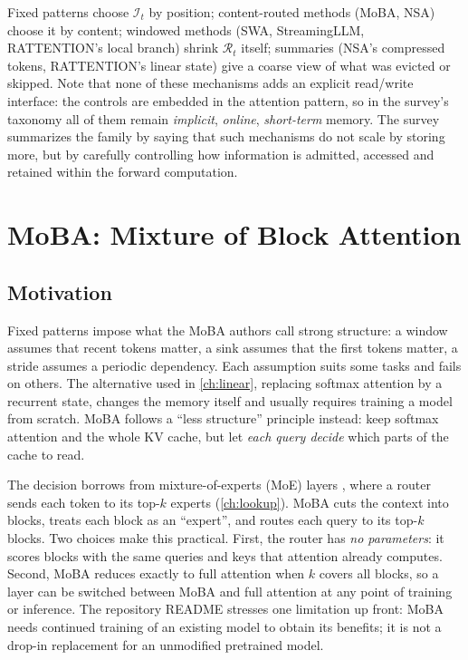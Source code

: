 Fixed patterns choose $\mathcal{I}_t$ by position; content-routed methods (MoBA, NSA) choose it
by content; windowed methods (SWA, StreamingLLM, RATTENTION's local branch) shrink
$\mathcal{R}_t$ itself; summaries (NSA's compressed tokens, RATTENTION's linear state) give a
coarse view of what was evicted or skipped. Note that none of these mechanisms adds an explicit
read/write interface: the controls are embedded in the attention pattern, so in the survey's
taxonomy all of them remain \emph{implicit}, \emph{online}, \emph{short-term} memory. The survey
summarizes the family by saying that such mechanisms do not scale by storing more, but by
carefully controlling how information is admitted, accessed and retained within the forward
computation.

\section{MoBA: Mixture of Block Attention}\label{sec:c04-moba}

\subsection{Motivation}

Fixed patterns impose what the MoBA authors call strong structure: a window assumes that recent
tokens matter, a sink assumes that the first tokens matter, a stride assumes a periodic
dependency. Each assumption suits some tasks and fails on others. The alternative used in
\cref{ch:linear}, replacing softmax attention by a recurrent state, changes the memory itself and
usually requires training a model from scratch. MoBA \citep{lu2025moba} follows a ``less
structure'' principle instead: keep softmax attention and the whole KV cache, but let \emph{each
query decide} which parts of the cache to read.

The decision borrows from mixture-of-experts (MoE) layers \citep{c01-shazeer2017moe},
where a router sends each token to its top-$k$ experts (\cref{ch:lookup}). MoBA cuts the context
into blocks, treats each block as an ``expert'', and routes each query to its top-$k$ blocks. Two
choices make this practical. First, the router has \emph{no parameters}: it scores blocks with
the same queries and keys that attention already computes. Second, MoBA reduces exactly to full
attention when $k$ covers all blocks, so a layer can be switched between MoBA and full attention
at any point of training or inference. The repository README stresses one limitation up front:
MoBA needs continued training of an existing model to obtain its benefits; it is not a drop-in
replacement for an unmodified pretrained model.

